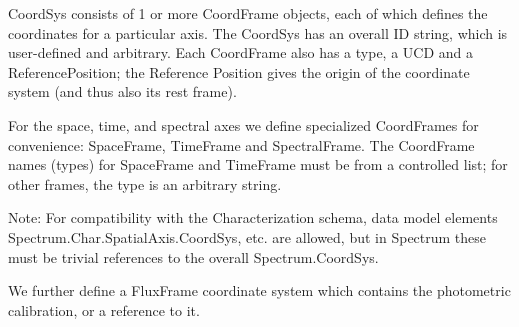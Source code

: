 \documentclass[11pt]{article}
\begin{document}
  CoordSys consists of 1 or more CoordFrame objects, each of which defines
the coordinates for a particular axis. The CoordSys has an overall ID string,
which is user-defined and arbitrary. 
Each CoordFrame also has a type, a UCD and a ReferencePosition; the Reference
Position gives the origin of the coordinate system (and thus also its rest frame).

For the space, time, and spectral axes we define specialized CoordFrames
for convenience: SpaceFrame, TimeFrame and SpectralFrame. The
CoordFrame names (types) for SpaceFrame and TimeFrame must be from a
controlled list; for other frames, the type is an arbitrary string.

Note: For compatibility with the Characterization schema, data model
elements Spectrum.Char.SpatialAxis.CoordSys, etc. are allowed, but
in Spectrum these must be trivial references to the overall
Spectrum.CoordSys.

We further define a FluxFrame coordinate system which contains the photometric calibration,
or a reference to it.


\setcounter{table}{3}
\end{document}

